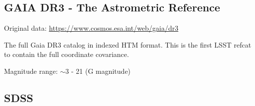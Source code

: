 \subsection{GAIA DR3 - The Astrometric Reference}
\label{sec:gaiadr3}
Original data: \url{https://www.cosmos.esa.int/web/gaia/dr3}

The full Gaia DR3 catalog in indexed HTM format. 
This is the first LSST refcat to contain the full coordinate covariance.

Magnitude range: $\sim$3 - 21 (G magnitude)

\subsection{SDSS}
\label{sec:sdss}




